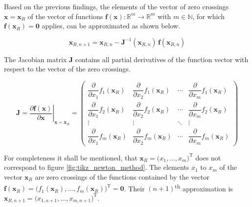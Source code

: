 Based on the previous findings, the elements of the vector of zero crossings $\mathrm{\mathbf{x}} = \mathrm{\mathbf{x}}_R$ of the vector of functions $\mathrm{\mathbf{f}} \left( \mathrm{\mathbf{x}} \right) : \mathbb{R}^m \to \mathbb{R}^m$ with $m \in \mathbb{N}$, for which $\mathrm{\mathbf{f}}\left( \mathrm{\mathbf{x}}_R \right) = \mathbf{0}$ applies, can be approximated as shown below.
\begin{center}
	\begin{equation} \label{eq:vect_x_approx}
		\mathrm{\mathbf{x}}_{R, n + 1} = \mathrm{\mathbf{x}}_{R,n} 	- \mathrm{\mathbf{J}}^{-1}\left( \mathrm{\mathbf{x}}_{R,n} \right) \, \mathrm{\mathbf{f}}\left( \mathrm{\mathbf{x}}_{R,n} \right) 
	\end{equation}
\end{center}
The Jacobian matrix $\mathrm{\mathbf{J}}$ contains all partial derivatives of the function vector with respect to the vector of the zero crossings.
\begin{center}
	\begin{equation} \label{eq:jacobian}
		\mathrm{\mathbf{J}} = \left. \dfrac{\partial \mathrm{\mathbf{f}}\left(\mathrm{\mathbf{x}}\right)}{\partial \mathrm{\mathbf{x}}} \right|_{\mathrm{\mathbf{x}} = \mathrm{\mathbf{x}}_R} = 
 		\begin{pmatrix}
  			\dfrac{\partial}{\partial x_1} f_1\left( \mathrm{\mathbf{x}}_R \right) & \dfrac{\partial}{\partial x_2} f_1\left( \mathrm{\mathbf{x}}_R \right) & \cdots & \dfrac{\partial}{\partial x_m} f_1\left( \mathrm{\mathbf{x}}_R \right) \\
			\dfrac{\partial}{\partial x_1} f_2\left( \mathrm{\mathbf{x}}_R \right) & \dfrac{\partial}{\partial x_2} f_2\left( \mathrm{\mathbf{x}}_R \right) & \cdots & \dfrac{\partial}{\partial x_m} f_2\left( \mathrm{\mathbf{x}}_R \right) \\
			\vdots & \vdots & \ddots & \vdots \\
  			\dfrac{\partial}{\partial x_1} f_m\left( \mathrm{\mathbf{x}}_R \right) & \dfrac{\partial}{\partial x_2} f_m\left( \mathrm{\mathbf{x}}_R \right) & \cdots & \dfrac{\partial}{\partial x_m} f_m\left( \mathrm{\mathbf{x}}_R \right) 
 		\end{pmatrix}
 	\end{equation}
\end{center}
For completeness it shall be mentioned, that $ \mathrm{\mathbf{x}}_R = \big( x_1, \dotsc, x_m \big)^{\mathrm T } $ does not correspond to figure \ref{fig:tikz_newton_method}. The elements $x_1$ to $x_m$ of the vector $\mathrm{\mathbf{x}}_R$ are zero crossings of the functions contained by the vector $\mathrm{\mathbf{f}} \left( \mathrm{\mathbf{x}}_R \right) = \big( f_1\left( \mathrm{\mathbf{x}}_R \right), \dotsc, f_m\left( \mathrm{\mathbf{x}}_R \right) \big)^{\mathrm T } = \mathbf{0}$. Their $\left(n + 1\right)$\textsuperscript{th} approximation is $\mathrm{\mathbf{x}}_{R,n + 1} = \big( x_{1,n + 1}, \dotsc, x_{m,n + 1} \big)^{\mathrm T}$.







